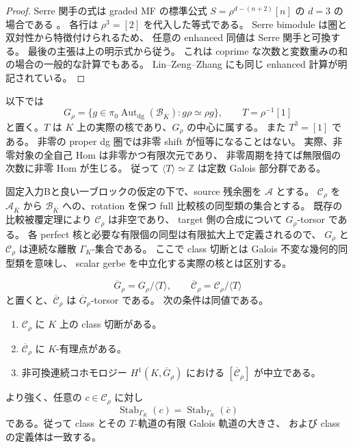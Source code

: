 \begin{proof}
Serre 関手の式は graded MF の標準公式
$S=\rho^{d-(n+2)}[n]$ の $d=3$ の場合である
\cite[Proposition~3.7]{NFLZSerre}。
各行は $\rho^3=[2]$ を代入した等式である。
Serre bimodule は圏と双対性から特徴付けられるため、
任意の enhanced 同値は Serre 関手と可換する。
最後の主張は上の明示式から従う。
これは coprime な次数と変数重みの和の場合の一般的な計算でもある。
Lin--Zeng--Zhang\cite[Proposition~2.1, Remark~2.2]{NFMLinZengZhangSingularity}
にも同じ enhanced 計算が明記されている。
\end{proof}

以下では
\[
 G_\rho=\{g\in\pi_0\operatorname{Aut}_{\mathrm{dg}}(\mathcal B_{\overline K}):
                   g\rho\simeq\rho g\},\qquad
 T=\rho^{-1}[1]
\]
と置く。$T$ は $K$ 上の実際の核であり、$G_\rho$ の中心に属する。
また $T^3=[1]$ である。
非零の proper dg 圏では非零 shift が恒等になることはない。
実際、非零対象の全自己 Hom は非零かつ有限次元であり、
非零周期を持てば無限個の次数に非零 Hom が生じる。
従って $\langle T\rangle\simeq\mathbb Z$ は定数 Galois 部分群である。

固定入力Bと良い一ブロックの仮定の下で、source 残余圏を $\mathcal A$ とする。
$\mathscr C_\rho$ を $\mathcal A_{\overline K}$ から
$\mathcal B_{\overline K}$ への、rotation を保つ full 比較核の同型類の集合とする。
既存の比較被覆定理により $\mathscr C_\rho$ は非空であり、
target 側の合成について $G_\rho$-torsor である。
各 perfect 核と必要な有限個の同型は有限拡大上で定義されるので、
$G_\rho$ と $\mathscr C_\rho$ は連続な離散 $\Gamma_K$-集合である。
ここで class 切断とは Galois 不変な幾何的同型類を意味し、
scalar gerbe を中立化する実際の核とは区別する。

\begin{proposition}
\label{prop:nfm-highdim-central-shift-obstruction}
\[
 \overline G_\rho=G_\rho/\langle T\rangle,\qquad
 \overline{\mathscr C}_\rho=\mathscr C_\rho/\langle T\rangle
\]
と置くと、$\overline{\mathscr C}_\rho$ は
$\overline G_\rho$-torsor である。
次の条件は同値である。
\begin{enumerate}
 \item $\mathscr C_\rho$ に $K$ 上の class 切断がある。
 \item $\overline{\mathscr C}_\rho$ に $K$-有理点がある。
 \item 非可換連続コホモロジー
       $H^1(K,\overline G_\rho)$ における
       $[\overline{\mathscr C}_\rho]$ が中立である。
\end{enumerate}
より強く、任意の $c\in\mathscr C_\rho$ に対し
\[
 \operatorname{Stab}_{\Gamma_K}(c)
 =\operatorname{Stab}_{\Gamma_K}(\overline c)
\]
である。従って class とその $T$-軌道の有限 Galois 軌道の大きさ、
および class の定義体は一致する。
\end{proposition}

